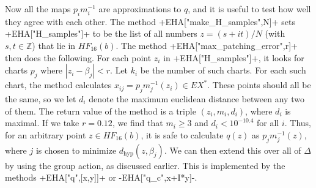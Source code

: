 \documentclass[reqno]{amsart}
\newcommand{\hyp}	{\operatorname{hyp}}
\newcommand{\Dl}        {\Delta}
\newcommand{\bt}        {\beta}
\newcommand{\Z}         {{\mathbb{Z}}}
\renewcommand{\:}{\colon}
\theoremstyle{definition}
\begin{document}
Now all the maps $p_im_i^{-1}$ are approximations to $q$, and it is
useful to test how well they agree with each other.  The method
\mcode+EHA["make_H_samples",N]+ sets \mcode+EHA["H_samples"]+ to be
the list of all numbers $z=(s+it)/N$ (with $s,t\in\Z$) that lie in
$HF_{16}(b)$.  The method \mcode+EHA["max_patching_error",r]+ then
does the following.  For each point $z_i$ in \mcode+EHA["H_samples"]+,
it looks for charts $p_j$ where $|z_i-\bt_j|<r$.  Let $k_i$ be the
number of such charts.  For each such chart, the method
calculates $x_{ij}=p_jm_j^{-1}(z_i)\in EX^*$.  These points should
all be the same, so we let $d_i$ denote the maximum euclidean
distance between any two of them.  The return value of the method is
a triple $(z_i,m_i,d_i)$, where $d_i$ is maximal.  If we take
$r=0.12$, we find that $m_i\geq 3$ and $d_i<10^{-10.4}$ for all $i$.
Thus, for an arbitrary point $z\in HF_{16}(b)$, it is safe to
calculate $q(z)$ as $p_jm_j^{-1}(z)$, where $j$ is chosen to minimize
$d_{\hyp}(z,\bt_j)$.  We can then extend this over all of $\Dl$ by
using the group action, as discussed earlier.  This is implemented by
the methods \mcode+EHA["q",[x,y]]+ or \mcode-EHA["q_c",x+I*y]-.
\end{document}
